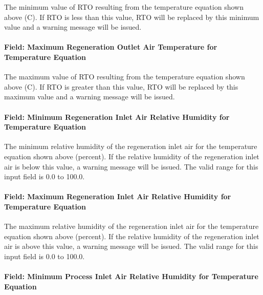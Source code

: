 The minimum value of RTO resulting from the temperature equation shown above (C). If RTO is less than this value, RTO will be replaced by this minimum value and a warning message will be issued.

\paragraph{Field: Maximum Regeneration Outlet Air Temperature for Temperature Equation}\label{field-maximum-regeneration-outlet-air-temperature-for-temperature-equation}

The maximum value of RTO resulting from the temperature equation shown above (C). If RTO is greater than this value, RTO will be replaced by this maximum value and a warning message will be issued.

\paragraph{Field: Minimum Regeneration Inlet Air Relative Humidity for Temperature Equation}\label{field-minimum-regeneration-inlet-air-relative-humidity-for-temperature-equation}

The minimum relative humidity of the regeneration inlet air for the temperature equation shown above (percent). If the relative humidity of the regeneration inlet air is below this value, a warning message will be issued. The valid range for this input field is 0.0 to 100.0.

\paragraph{Field: Maximum Regeneration Inlet Air Relative Humidity for Temperature Equation}\label{field-maximum-regeneration-inlet-air-relative-humidity-for-temperature-equation}

The maximum relative humidity of the regeneration inlet air for the temperature equation shown above (percent). If the relative humidity of the regeneration inlet air is above this value, a warning message will be issued. The valid range for this input field is 0.0 to 100.0.

\paragraph{Field: Minimum Process Inlet Air Relative Humidity for Temperature Equation}\label{field-minimum-process-inlet-air-relative-humidity-for-temperature-equation}


